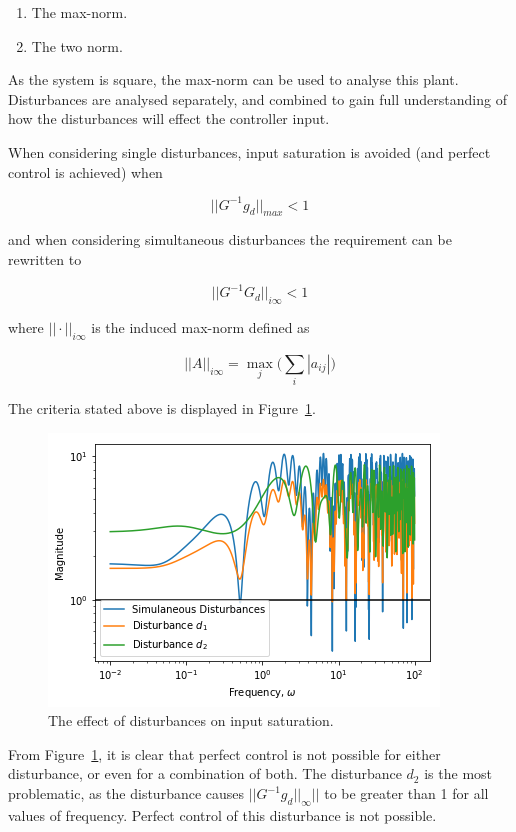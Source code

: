 \begin{enumerate}
	\item The max-norm.
	\item The two norm.
\end{enumerate}

As the system is square, the max-norm can be used to analyse this plant. Disturbances are analysed separately, and combined to gain full understanding of how the disturbances will effect the controller input. 

When considering single disturbances, input saturation is avoided (and perfect control is achieved) when

\begin{equation}
	||G^{-1} g_d||_{max} < 1 
\end{equation} 

and when considering simultaneous disturbances the requirement can be rewritten to

\begin{equation}
	||G^{-1} G_d||_{i\infty} < 1
\end{equation} 

where $||\cdot||_{i\infty}$ is the induced max-norm defined as

\begin{equation}
	||A||_{i\infty} = \max_{j} \Big(\sum_{i}|a_{ij}|\Big)
\end{equation}

The criteria stated above is displayed in Figure~\ref{fig:disturbance-analysis-2-max-norm}.

\begin{figure}[H]
	\centering
	\includegraphics[width=0.7\linewidth]{"Figures/Disturbance Analysis 2 Max Norm"}
	\caption{The effect of disturbances on input saturation.}
	\label{fig:disturbance-analysis-2-max-norm}
\end{figure}

From Figure~\ref{fig:disturbance-analysis-2-max-norm}, it is clear that perfect control is not possible for either disturbance, or even for a combination of both. The disturbance $d_2$ is the most problematic, as the disturbance causes $||G^{-1}g_d||_{\infty}||$ to be greater than 1 for all values of frequency. Perfect control of this disturbance is not possible. 

